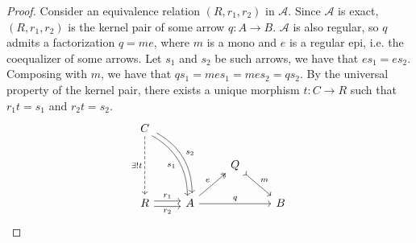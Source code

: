 \begin{subbox}{}
\begin{proof}
    Consider an equivalence relation $(R,r_1,r_2)$ in $\mathcal{A}$. Since $\mathcal{A}$ is exact, $(R,r_1,r_2)$ is the kernel pair of some arrow $q:A \to B$. $\mathcal{A}$ is also regular, so $q$ admits a factorization $q=me$, where $m$ is a mono and $e$ is a regular epi, i.e. the coequalizer of some arrows. Let $s_1$ and $s_2$ be such arrows, we have that $es_1=es_2$. Composing with $m$, we have that $qs_1=mes_1=mes_2=qs_2$. By the universal property of the kernel pair, there exists a unique morphism $t: C \to R$ such that $r_1t=s_1$ and $r_2t=s_2$.
    \[
\begin{tikzcd}
    C \arrow[rdd, "s_2", bend left, shift left] \arrow[rdd, "s_1"', bend left, shift right] \arrow[dd, "\exists ! t"', dashed] &                                              &                         &   \\
                                                                                                                               &                                              & Q \arrow[rd, "m", tail] &   \\
    R \arrow[r, "r_2"', shift right] \arrow[r, "r_1", shift left]                                                              & A \arrow[rr, "q"] \arrow[ru, "e", two heads] &                         & B
    \end{tikzcd}
    \]


\end{proof}
\end{subbox}
